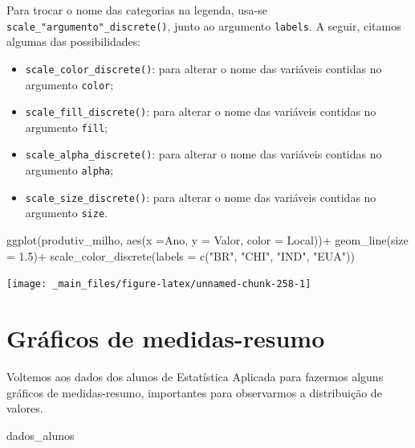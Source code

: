 \documentclass[
  brazilian,
]{book}
\newenvironment{Shaded}{\begin{snugshade}}{\end{snugshade}}
\newcommand{\AttributeTok}[1]{\textcolor[rgb]{0.77,0.63,0.00}{#1}}
\newcommand{\FloatTok}[1]{\textcolor[rgb]{0.00,0.00,0.81}{#1}}
\newcommand{\FunctionTok}[1]{\textcolor[rgb]{0.00,0.00,0.00}{#1}}
\newcommand{\NormalTok}[1]{#1}
\newcommand{\SpecialCharTok}[1]{\textcolor[rgb]{0.00,0.00,0.00}{#1}}
\newcommand{\StringTok}[1]{\textcolor[rgb]{0.31,0.60,0.02}{#1}}
\begin{document}
Para trocar o nome das categorias na legenda, usa-se \texttt{scale\_"argumento"\_discrete()}, junto ao argumento \texttt{labels}. A seguir, citamos algumas das possibilidades:

\begin{itemize}
\item
  \texttt{scale\_color\_discrete()}: para alterar o nome das variáveis contidas no argumento \texttt{color};
\item
  \texttt{scale\_fill\_discrete()}: para alterar o nome das variáveis contidas no argumento \texttt{fill};
\item
  \texttt{scale\_alpha\_discrete()}: para alterar o nome das variáveis contidas no argumento \texttt{alpha};
\item
  \texttt{scale\_size\_discrete()}: para alterar o nome das variáveis contidas no argumento \texttt{size}.
\end{itemize}

\begin{Shaded}
\begin{Highlighting}[]
\FunctionTok{ggplot}\NormalTok{(produtiv\_milho, }
       \FunctionTok{aes}\NormalTok{(}\AttributeTok{x =}\NormalTok{Ano,}
           \AttributeTok{y =}\NormalTok{ Valor,}
           \AttributeTok{color =}\NormalTok{ Local))}\SpecialCharTok{+}
  \FunctionTok{geom\_line}\NormalTok{(}\AttributeTok{size =} \FloatTok{1.5}\NormalTok{)}\SpecialCharTok{+}
  \FunctionTok{scale\_color\_discrete}\NormalTok{(}\AttributeTok{labels =} \FunctionTok{c}\NormalTok{(}\StringTok{"BR"}\NormalTok{, }\StringTok{"CHI"}\NormalTok{, }\StringTok{"IND"}\NormalTok{, }\StringTok{"EUA"}\NormalTok{))}
\end{Highlighting}
\end{Shaded}

\begin{center}\texttt{[image: \_main\_files/figure-latex/unnamed-chunk-258-1]} \end{center}

\hypertarget{gruxe1ficos-de-medidas-resumo}{%
\section{Gráficos de medidas-resumo}\label{gruxe1ficos-de-medidas-resumo}}

Voltemos aos dados dos alunos de Estatística Aplicada para fazermos alguns gráficos de medidas-resumo, importantes para observarmos a distribuição de valores.

\begin{Shaded}
\begin{Highlighting}[]
\NormalTok{dados\_alunos}
\end{Highlighting}
\end{Shaded}
\end{document}

